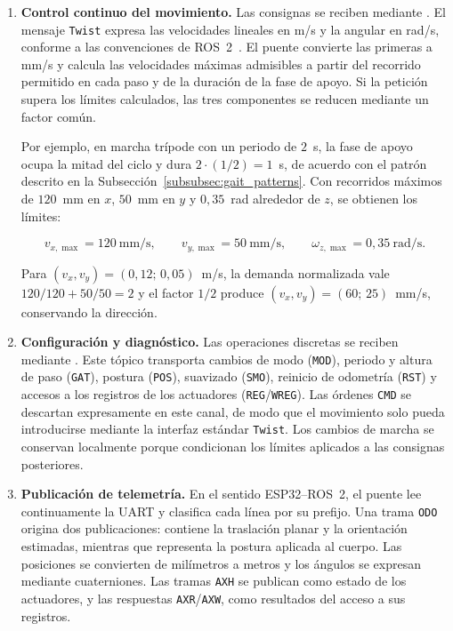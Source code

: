 \begin{enumerate}[label=\textbf{\arabic*.},leftmargin=*,itemsep=0.4\baselineskip,
                  topsep=0.2\baselineskip,parsep=0.2\baselineskip]
    \item \textbf{Control continuo del movimiento.}
    Las consignas se reciben mediante . El mensaje
    \texttt{Twist} expresa las velocidades lineales en m/s y la angular en rad/s,
    conforme a las convenciones de ROS~2~\cite{ros2_docs}. El puente convierte las
    primeras a mm/s y calcula las velocidades máximas admisibles a partir del
    recorrido permitido en cada paso y de la duración de la fase de apoyo. Si la
    petición supera los límites calculados, las tres componentes se reducen mediante
    un factor común.

    Por ejemplo, en marcha trípode con un periodo de $2$~s, la fase de apoyo ocupa
    la mitad del ciclo y dura $2\cdot(1/2)=1$~s, de acuerdo con el patrón descrito en
    la Subsección~\ref{subsubsec:gait_patterns}. Con recorridos máximos de $120$~mm
    en $x$, $50$~mm en $y$ y $0{,}35$~rad alrededor de $z$, se obtienen los límites:

    \begingroup
    \setlength{\abovedisplayskip}{0.35\baselineskip}
    \setlength{\belowdisplayskip}{0.35\baselineskip}
    \[
        v_{x,\max}=120~\text{mm/s}, \qquad
        v_{y,\max}=50~\text{mm/s}, \qquad
        \omega_{z,\max}=0{,}35~\text{rad/s}.
    \]
    \endgroup

    Para $(v_x,v_y)=(0{,}12;\,0{,}05)$~m/s, la demanda normalizada vale
    $120/120+50/50=2$ y el factor $1/2$ produce $(v_x,v_y)=(60;\,25)$~mm/s, conservando la dirección.

    \item \textbf{Configuración y diagnóstico.}
    Las operaciones discretas se reciben mediante
    . Este tópico transporta cambios de modo
    (\texttt{MOD}), periodo y altura de paso (\texttt{GAT}), postura
    (\texttt{POS}), suavizado (\texttt{SMO}), reinicio de odometría (\texttt{RST}) y accesos a los
    registros de los actuadores (\texttt{REG}/\texttt{WREG}). Las órdenes
    \texttt{CMD} se descartan expresamente en este canal, de modo que el movimiento
    solo pueda introducirse mediante la interfaz estándar \texttt{Twist}. Los cambios
    de marcha se conservan localmente porque condicionan los límites aplicados a las
    consignas posteriores.

    \item \textbf{Publicación de telemetría.}
    En el sentido ESP32--ROS~2, el puente lee continuamente la UART y clasifica cada
    línea por su prefijo. Una trama \texttt{ODO} origina dos publicaciones:
     contiene la traslación planar y la orientación
    estimadas, mientras que  representa la postura aplicada
    al cuerpo. Las posiciones se convierten de milímetros a metros y los ángulos se
    expresan mediante cuaterniones. Las tramas \texttt{AXH} se publican como estado de
    los actuadores, y las respuestas \texttt{AXR}/\texttt{AXW}, como resultados del
    acceso a sus registros.
\end{enumerate}

